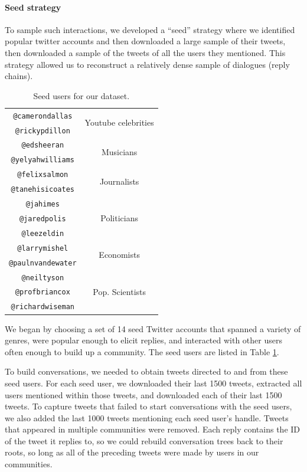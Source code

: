 \documentclass[11pt,letterpaper]{article}
\begin{document}
\paragraph{Seed strategy}

To sample such interactions, we developed a ``seed'' strategy where we identified popular twitter accounts and then downloaded a large sample of their tweets, then downloaded a sample of the tweets of all the users they mentioned. This strategy allowed us to reconstruct a relatively dense sample of dialogues (reply chains).

\begin{table}
\begin{center}
\begin{tabular}{|c|c|}
\hline
{\tt @camerondallas} & \multirow{2}{*}{Youtube celebrities} \\
{\tt @rickypdillon} & \\
\hline
{\tt @edsheeran} & \multirow{2}{*}{Musicians} \\
{\tt @yelyahwilliams} & \\
\hline
{\tt @felixsalmon} & \multirow{2}{*}{Journalists} \\
{\tt @tanehisicoates} & \\
\hline
{\tt @jahimes} & \multirow{3}{*}{Politicians} \\
{\tt @jaredpolis} & \\
{\tt @leezeldin} & \\
\hline
{\tt @larrymishel} & \multirow{2}{*}{Economists} \\
{\tt @paulnvandewater} & \\
\hline
{\tt @neiltyson} & \multirow{3}{*}{Pop. Scientists} \\
{\tt @profbriancox} & \\
{\tt @richardwiseman} & \\
\hline
\end{tabular}
\end{center}
\caption{\label{tab:seed-users} Seed users for our dataset.}
\end{table}

We began by choosing a set of 14 seed Twitter accounts that spanned a variety of genres, were popular enough to elicit replies, and interacted with other users often enough to build up a community.  The seed users are listed in Table \ref{tab:seed-users}.  

To build conversations, we needed to obtain tweets directed to and from these seed users. For each seed user, we downloaded their last 1500 tweets, extracted all users mentioned within those tweets, and downloaded each of their last 1500 tweets.  To capture tweets that failed to start conversations with the seed users, we also added the last 1000 tweets mentioning each seed user's handle.  Tweets that appeared in multiple communities were removed.  Each reply contains the ID of the tweet it replies to, so we could rebuild conversation trees back to their roots, so long as all of the preceding tweets were made by users in our communities.
\end{document}
